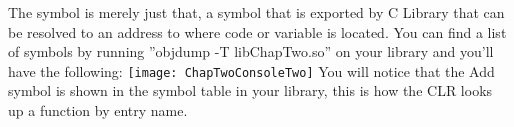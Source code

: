 The symbol is merely just that, a symbol that is exported by C Library that can be resolved to an address to where code or variable is located. You can find a list of symbols by running ''objdump -T libChapTwo.so'' on your library and you'll have the following:
\newline \newline
\texttt{[image: ChapTwoConsoleTwo]}
\newline\newline
You will notice that the Add symbol is shown in the symbol table in your library, this is how the CLR looks up a function by entry name.